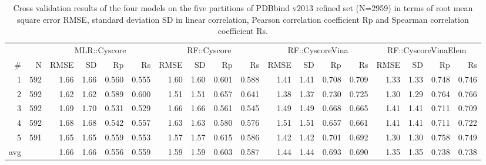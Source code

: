 \documentclass[twocolumn]{bmcart}
\begin{document}
\begin{backmatter}
\begin{sidewaystable}[ht]
\caption{Cross validation results of the four models on the five partitions of PDBbind v2013 refined set (N=2959) in terms of root mean square error RMSE, standard deviation SD in linear correlation, Pearson correlation coefficient Rp and Spearman correlation coefficient Rs.}
\label{tbl:cv}
\begin{tabular}{rrrrrrrrrrrrrrrrrr}
\hline
&&\multicolumn{4}{c}{MLR::Cyscore} & \multicolumn{4}{c}{RF::Cyscore} & \multicolumn{4}{c}{RF::CyscoreVina} & \multicolumn{4}{c}{RF::CyscoreVinaElem}\\
\# & N & RMSE & SD & Rp & Rs & RMSE & SD & Rp & Rs & RMSE & SD & Rp & Rs & RMSE & SD & Rp & Rs\\
\hline
  1 & 592 & 1.66 & 1.66 & 0.560 & 0.555 & 1.60 & 1.60 & 0.601 & 0.588 & 1.41 & 1.41 & 0.708 & 0.709 & 1.33 & 1.33 & 0.748 & 0.746\\
  2 & 592 & 1.62 & 1.62 & 0.589 & 0.600 & 1.51 & 1.51 & 0.657 & 0.641 & 1.38 & 1.37 & 0.730 & 0.725 & 1.30 & 1.29 & 0.764 & 0.766\\
  3 & 592 & 1.69 & 1.70 & 0.531 & 0.529 & 1.66 & 1.66 & 0.561 & 0.545 & 1.49 & 1.49 & 0.668 & 0.665 & 1.41 & 1.41 & 0.711 & 0.709\\
  4 & 592 & 1.68 & 1.68 & 0.542 & 0.557 & 1.63 & 1.63 & 0.580 & 0.576 & 1.51 & 1.51 & 0.657 & 0.661 & 1.41 & 1.41 & 0.711 & 0.722\\
  5 & 591 & 1.65 & 1.65 & 0.559 & 0.553 & 1.57 & 1.57 & 0.615 & 0.586 & 1.42 & 1.42 & 0.701 & 0.692 & 1.30 & 1.30 & 0.758 & 0.749\\
avg &     & 1.66 & 1.66 & 0.556 & 0.559 & 1.59 & 1.59 & 0.603 & 0.587 & 1.44 & 1.44 & 0.693 & 0.690 & 1.35 & 1.35 & 0.738 & 0.738\\
\hline
\end{tabular}
\end{sidewaystable}


\end{backmatter}
\end{document}
